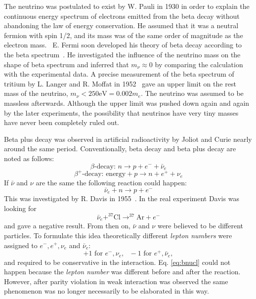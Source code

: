 The neutrino was postulated to exist by W. Pauli in 1930 in order to explain the continuous energy spectrum of electrons emitted from the beta decay without abandoning the law of energy conservation. He assumed that it was a neutral fermion with spin 1/2, and its mass was of the same order of magnitude as the electron mass.~\cite{Pau30} E. Fermi soon developed his theory of beta decay according to the beta spectrum~\cite{Fer33,Fer34}. He investigated the influence of the neutrino mass on the shape of beta spectrum and inferred that $m_\nu \approx 0$ by comparing the calculation with the experimental data. A precise measurement of the beta spectrum of tritium by L. Langer and R. Moffat in 1952~\cite{Lan52} gave an upper limit on the rest mass of the neutrino, $m_\nu < 250 \mbox{eV} = 0.002m_e$. The neutrino was assumed to be massless afterwards. Although the upper limit was pushed down again and again by the later experiments, the possibility that neutrinos have very tiny masses have never been completely ruled out.

Beta plus decay was observed in artificial radioactivity by Joliot and Curie nearly around the same period. Conventionally, beta decay and beta plus decay are noted as follows:
\begin{equation}
  \label{eq:bd}
  \beta\mbox{-decay: } n \rightarrow p+e^{-}+\bar{\nu}_e
\end{equation}
\begin{equation}
  \label{eq:bpd}
  \beta^+\mbox{-decay: energy} + p \rightarrow n+e^{+}+\nu_e
\end{equation}
If $\bar{\nu}$ and $\nu$ are the same the following reaction could happen:
\begin{equation}
  \label{eq:bnun}
  \bar{\nu}_e + n \rightarrow p+e^{-}
\end{equation}
This was investigated by R. Davis in 1955~\cite{Dav55,Dav56}. In the real experiment Davis was looking for
\begin{equation}
  \label{eq:bnucl}
  \bar{\nu}_e + ^{37}\mbox{Cl} \rightarrow ^{37}\mbox{Ar}+e^{-}
\end{equation}
and gave a negative result. From then on, $\bar{\nu}$ and $\nu$ were believed to be different particles. To formulate this idea theoretically different \emph{lepton numbers} were assigned to $e^{-}, e^{+}, \nu_e$ and $\bar{\nu}_e$:
\begin{equation}
  \label{eq:ln}
  +1 \mbox{ for }e^{-}, \nu_e, \mbox{   }-1 \mbox{ for }e^{+},\bar{\nu}_e,
\end{equation}
and required to be conservative in the interaction. Eq. \ref{eq:bnucl} could not happen because the \emph{lepton number} was different before and after the reaction. However, after parity violation in weak interaction was observed the same phenomenon was no longer necessarily to be elaborated in this way.

